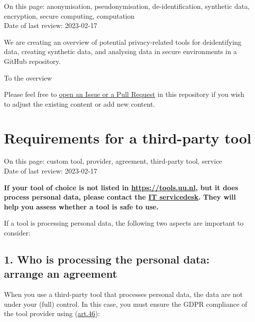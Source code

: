 \documentclass[
]{book}
\begin{document}
On this page: anonymisation, pseudonymisation, de-identification, synthetic data, encryption,
secure computing, computation\\
Date of last review: 2023-02-17

We are creating an overview of potential privacy-related tools for
deidentifying data, creating synthetic data, and analysing data in secure
environments in a GitHub repository.

To the overview

Please feel free to
\href{https://github.com/UtrechtUniversity/privacy-engineering-tools/\#contact-and-contribution}{open an Issue or a Pull Request}
in this repository if you wish to adjust the existing content or add new content.

\hypertarget{tool-requirements}{%
\section{Requirements for a third-party tool}\label{tool-requirements}}

On this page: custom tool, provider, agreement, third-party tool, service\\
Date of last review: 2023-02-17

\textbf{If your tool of choice is not listed in \url{https://tools.uu.nl}, but it does
process personal data, please contact the
\href{https://www.uu.nl/en/organisation/information-and-technology-services-its/i-want-to/get-help-and-advice}{IT servicedesk}.
They will help you assess whether a tool is safe to use.}

If a tool is processing personal data, the following two aspects are important to consider:

\hypertarget{who-is-processing-the-personal-data-arrange-an-agreement}{%
\subsection{1. Who is processing the personal data: arrange an agreement}\label{who-is-processing-the-personal-data-arrange-an-agreement}}

When you use a third-party tool that processes personal data, the data are not
under your (full) control. In this case, you must ensure the GDPR compliance of
the tool provider using (\href{https://gdpr-info.eu/art-46-gdpr/}{art.46}):
\end{document}
